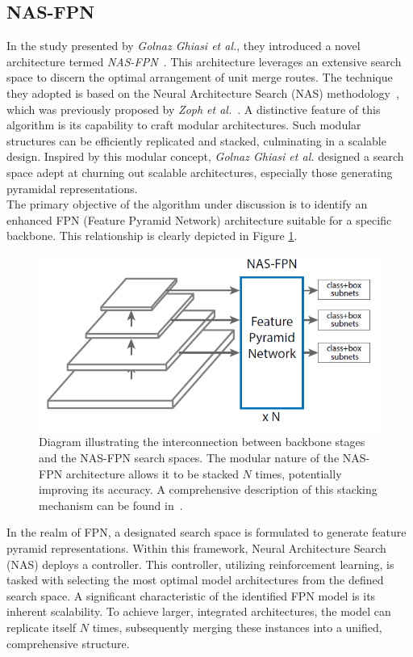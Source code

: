 \subsection{NAS-FPN}
In the study presented by \textit{Golnaz Ghiasi et al.}, they introduced a novel architecture termed \textit{NAS-FPN}~\cite{DBLP:journals/corr/abs-1904-07392}. This architecture leverages an extensive search space to discern the optimal arrangement of unit merge routes. The technique they adopted is based on the Neural Architecture Search (NAS) methodology~\cite{DBLP:journals/corr/ZophL16}, which was previously proposed by \textit{Zoph et al.}~\cite{DBLP:journals/corr/ZophVSL17}. A distinctive feature of this algorithm is its capability to craft modular architectures. Such modular structures can be efficiently replicated and stacked, culminating in a scalable design. Inspired by this modular concept, \textit{Golnaz Ghiasi et al.} designed a search space adept at churning out scalable architectures, especially those generating pyramidal representations.\\

The primary objective of the algorithm under discussion is to identify an enhanced FPN (Feature Pyramid Network) architecture suitable for a specific backbone. This relationship is clearly depicted in Figure \ref{fig:nas-fpn-space}.
\begin{figure}[htb]
    \centering
    \includegraphics[width=0.4\linewidth]{figures/chapters-imgs/30/nas-fpn-space.png}
    \caption[Diagram illustrating the interconnection between backbone stages and the NAS-FPN search spaces.]{Diagram illustrating the interconnection between backbone stages and the NAS-FPN search spaces. The modular nature of the NAS-FPN architecture allows it to be stacked $N$ times, potentially improving its accuracy. A comprehensive description of this stacking mechanism can be found in~\cite{DBLP:journals/corr/abs-1904-07392}.}
    \label{fig:nas-fpn-space}
\end{figure}
In the realm of FPN, a designated search space is formulated to generate feature pyramid representations. Within this framework, Neural Architecture Search (NAS) deploys a controller. This controller, utilizing reinforcement learning, is tasked with selecting the most optimal model architectures from the defined search space. A significant characteristic of the identified FPN model is its inherent scalability. To achieve larger, integrated architectures, the model can replicate itself $N$ times, subsequently merging these instances into a unified, comprehensive structure.\\

